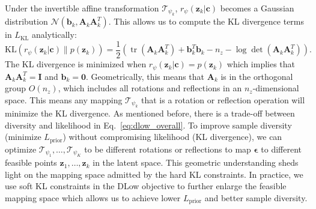 \documentclass[runningheads]{llncs}
\begin{document}
	Under the invertible affine transformation $\mathcal{T}_{\psi_k}$, $r_\psi(\mathbf{z}_k|\mathbf{c})$ becomes a Gaussian distribution $\mathcal{N}(\mathbf{b}_k, \mathbf{A}_k\mathbf{A}_k^T)$. This allows us to compute the KL divergence terms in $L_\text{KL}$ analytically:
	\begin{equation}
	\label{eq:dlow_kl}
	\text{KL} (r_\psi(\mathbf{z}_k|\mathbf{c})\| p(\mathbf{z}_k)) = \frac{1}{2}\left(\operatorname{tr}\left(\mathbf{A}_k\mathbf{A}_k^T\right)+\mathbf{b}_k^T\mathbf{b}_k -n_z - \log\det\left(\mathbf{A}_k\mathbf{A}_k^T\right) \right).
	\end{equation}
	The KL divergence is minimized when $r_\psi(\mathbf{z}_k|\mathbf{c}) = p(\mathbf{z}_k)$ which implies that $\mathbf{A}_k\mathbf{A}_k^T = \mathbf{I}$ and $\mathbf{b}_k = \mathbf{0}$. Geometrically, this means that $\mathbf{A}_k$ is in the orthogonal group $O(n_z)$, which includes all rotations and reflections in an $n_z$-dimensional space. This means any mapping $\mathcal{T}_{\psi_k}$ that is a rotation or reflection operation will minimize the KL divergence. As mentioned before, there is a trade-off between diversity and likelihood in Eq.~\eqref{eq:dlow_overall}. To improve sample diversity (minimize $L_\text{prior}$) without compromising likelihood (KL divergence), we can optimize $\mathcal{T}_{\psi_1}, \ldots, \mathcal{T}_{\psi_K}$ to be different rotations or reflections to map $\boldsymbol{\epsilon}$ to different feasible points $\mathbf{z}_1, \ldots, \mathbf{z}_k$ in the latent space. This geometric understanding sheds light on the mapping space admitted by the hard KL constraints. In practice, we use soft KL constraints in the DLow objective to further enlarge the feasible mapping space which allows us to achieve lower $L_\text{prior}$ and better sample diversity.
	
\end{document}
